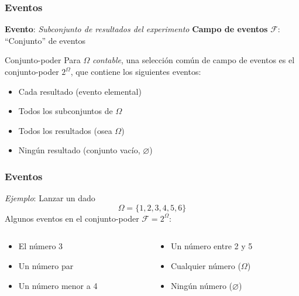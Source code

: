 \documentclass[xcolor=dvipsnames,10pt]{beamer}
\begin{document}
\begin{frame}
  \frametitle{Eventos}
  \begin{tcolorbox}
    \textbf{Evento}: \emph{Subconjunto de resultados del experimento}
    \tcblower
    \textbf{Campo de eventos} $\mathcal{F}$: ``Conjunto'' de eventos
  \end{tcolorbox}
  \begin{definicion*}{Conjunto-poder}{}
    Para $\Omega$ \emph{contable}, una selección común de campo de eventos es el conjunto-poder $2^{\Omega}$, que contiene los siguientes eventos:
    \begin{itemize}
    \item Cada resultado (evento elemental)
    \item Todos los subconjuntos de $\Omega$
    \item Todos los resultados (osea $\Omega$)
    \item Ningún resultado (conjunto vacío, $\varnothing$)
    \end{itemize}
  \end{definicion*}
\end{frame}
%
\begin{frame}
  \frametitle{Eventos}
  \emph{Ejemplo}: Lanzar un dado
  \begin{equation*}
    \Omega = \{1, 2, 3, 4, 5, 6 \}
  \end{equation*}
  Algunos eventos en el conjunto-poder $\mathcal{F} = 2^{\Omega}$:
  \begin{columns}
    \begin{column}{0.48\textwidth}
      \begin{itemize}
      \item El número 3
      \item Un número par
      \item Un número menor a 4
      \end{itemize}
    \end{column}
    \begin{column}{0.48\textwidth}
      \begin{itemize}
      \item Un número entre 2 y 5
      \item Cualquier número ($\Omega$)
      \item Ningún número ($\varnothing$)
      \end{itemize}
    \end{column}
  \end{columns}
\end{frame}
\end{document}
